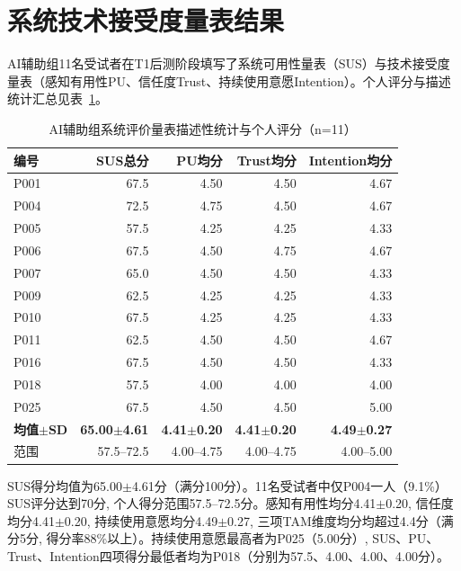 
\section{系统技术接受度量表结果}
\label{sec:acceptance}

AI辅助组11名受试者在T1后测阶段填写了系统可用性量表（SUS）与技术接受度量表（感知有用性PU、信任度Trust、持续使用意愿Intention）。个人评分与描述统计汇总见表~\ref{tab:acceptance}。

\begin{table}[htbp]
\centering
\caption{AI辅助组系统评价量表描述性统计与个人评分（n=11）}
\label{tab:acceptance}

\small
\begin{tabular}{lrrrr}
\toprule
编号 & SUS总分 & PU均分 & Trust均分 & Intention均分 \\
\midrule
P001 & 67.5 & 4.50 & 4.50 & 4.67 \\
P004 & 72.5 & 4.75 & 4.50 & 4.67 \\
P005 & 57.5 & 4.25 & 4.25 & 4.33 \\
P006 & 67.5 & 4.50 & 4.75 & 4.67 \\
P007 & 65.0 & 4.50 & 4.50 & 4.33 \\
P009 & 62.5 & 4.25 & 4.25 & 4.33 \\
P010 & 67.5 & 4.25 & 4.25 & 4.33 \\
P011 & 62.5 & 4.50 & 4.50 & 4.67 \\
P016 & 67.5 & 4.50 & 4.50 & 4.33 \\
P018 & 57.5 & 4.00 & 4.00 & 4.00 \\
P025 & 67.5 & 4.50 & 4.50 & 5.00 \\
\midrule
\textbf{均值$\pm$SD} & \textbf{65.00$\pm$4.61} & \textbf{4.41$\pm$0.20} & \textbf{4.41$\pm$0.20} & \textbf{4.49$\pm$0.27} \\
范围 & 57.5--72.5 & 4.00--4.75 & 4.00--4.75 & 4.00--5.00 \\
\bottomrule
\end{tabular}

\end{table}

SUS得分均值为65.00$\pm$4.61分（满分100分）。11名受试者中仅P004一人（9.1\%）SUS评分达到70分, 个人得分范围57.5--72.5分。感知有用性均分4.41$\pm$0.20, 信任度均分4.41$\pm$0.20, 持续使用意愿均分4.49$\pm$0.27, 三项TAM维度均分均超过4.4分（满分5分, 得分率88\%以上）。持续使用意愿最高者为P025（5.00分）, SUS、PU、Trust、Intention四项得分最低者均为P018（分别为57.5、4.00、4.00、4.00分）。

